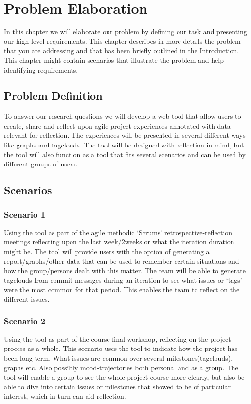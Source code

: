 \chapter{Problem Elaboration}
\label{problemelaboration}
In this chapter we will elaborate our problem by defining our task and presenting our high level requirements.
This chapter describes in more details the problem that you are addressing and that
has been briefly outlined in the Introduction. This chapter might contain scenarios that
illustrate the problem and help identifying requirements.

\section{Problem Definition}
\label{problemdefinition}

To answer our research questions we will develop a web-tool that allow users to create, share and reflect upon agile project experiences annotated with data relevant for reflection. 
The experiences will be presented in several different ways like graphs and tagclouds. The tool will be designed with reflection in mind, but the tool will also function as 
a tool that fits several scenarios and can be used by different groups of users.  

\section{Scenarios}
\label{problemdefinition}

\subsection{Scenario 1}
\label{scenario1}
Using the tool as part of the agile methodic ‘Scrums’ retrospective-reflection meetings reflecting upon the last week/2weeks or what the iteration duration might be.  The tool will provide users with the option of generating a report/graphs/other data that can be used to remember certain situations and how the group/persons dealt with this matter. The team will be able to generate tagclouds from commit messages during an iteration to see what issues or ‘tags’ were the most common for that period. This enables the team to reflect on the different issues. 
\subsection{Scenario 2}
\label{scenario1}
Using the tool as part of the course final workshop, reflecting on the project process as a whole. 
This scenario uses the tool to indicate how the project has been long-term. What issues are common over several milestones(tagclouds), graphs etc. Also possibly mood-trajectories both personal and as a group. The tool will enable a group to see the whole project course more clearly, but also be able to dive into certain issues or milestones that showed to be of particular interest, which in turn can aid reflection. 
